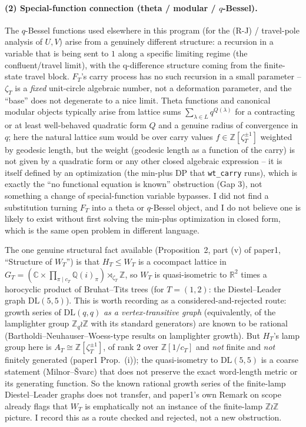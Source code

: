 \documentclass[11pt]{article}
\begin{document}
\paragraph{(2) Special-function connection (theta / modular / $q$-Bessel).}
The $q$-Bessel functions used elsewhere in this program (for the (R-J) /
travel-pole analysis of $U,V$) arise from a genuinely different structure: a
recursion in a variable that is being sent to $1$ along a specific limiting
regime (the confluent/travel limit), with the q-difference structure coming
from the finite-state travel block. $F_T$'s carry process has no such
recursion in a small parameter -- $\zeta_T$ is a \emph{fixed} unit-circle
algebraic number, not a deformation parameter, and the ``base'' does not
degenerate to a nice limit. Theta functions and canonical modular objects
typically arise from lattice sums $\sum_{\lambda\in L}q^{Q(\lambda)}$ for a
contracting or at least well-behaved quadratic form $Q$ and a genuine radius
of convergence in $q$; here the natural lattice sum would be over carry values
$f\in\mathbb Z[\zeta_T^{\pm1}]$ weighted by geodesic length, but the weight
(geodesic length as a function of the carry) is not given by a quadratic form
or any other closed algebraic expression -- it is itself defined by an
optimization (the min-plus DP that \texttt{wt\_carry} runs), which is exactly
the ``no functional equation is known'' obstruction (Gap 3), not something a
change of special-function variable bypasses. I did not find a substitution
turning $F_T$ into a theta or $q$-Bessel object, and I do not believe one is
likely to exist without first solving the min-plus optimization in closed
form, which is the same open problem in different language.

The one genuine structural fact available (Proposition~2, part (v) of
paper1, ``Structure of $W_T$'') is that $H_T\le W_T$ is a cocompact lattice in
$G_T=(\mathbb C\times\prod_{\pi\mid c_T}\mathbb Q(i)_\pi)\rtimes_{\zeta_T}
\mathbb Z$, so $W_T$ is quasi-isometric to $\mathbb R^2$ times a horocyclic
product of Bruhat--Tits trees (for $T=(1,2)$: the Diestel--Leader graph
$\mathrm{DL}(5,5)$). This is worth recording as a considered-and-rejected
route: growth series of $\mathrm{DL}(q,q)$ \emph{as a vertex-transitive graph}
(equivalently, of the lamplighter group $\mathbb Z_q\wr\mathbb Z$ with its
standard generators) are known to be rational (Bartholdi--Neuhauser--Woess-type
results on lamplighter growth). But $H_T$'s lamp group here is $A_T\cong
\mathbb Z[\zeta_T^{\pm1}]$, of rank $2$ over $\mathbb Z[1/c_T]$ and \emph{not}
finite and \emph{not} finitely generated (paper1 Prop.\ (i)); the
quasi-isometry to $\mathrm{DL}(5,5)$ is a coarse statement (Milnor--Švarc) that
does not preserve the exact word-length metric or its generating function. So
the known rational growth series of the finite-lamp Diestel--Leader graphs
does not transfer, and paper1's own Remark on scope already flags that $W_T$
is emphatically not an instance of the finite-lamp $\mathbb Z\wr\mathbb Z$
picture. I record this as a route checked and rejected, not a new obstruction.
\end{document}
